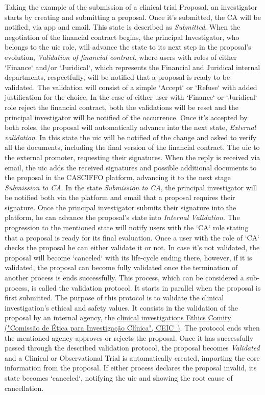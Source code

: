 Taking the example of the submission of a clinical trial Proposal, an investigator starts by creating and submitting a proposal. Once it's submitted, the CA will be notified, via app and email. This state is described as \textit{Submitted}.  
When the negotiation of the financial contract begins, the principal Investigator, who belongs to the \acrshort{uic} role, will advance the state to its next step in the proposal's evolution, \textit{Validation of financial contract}, where users with roles of either `Finance` and/or `Juridical`, which represents the Financial and Juridical internal departments, respectfully, will be notified that a proposal is ready to be validated. The validation will consist of a simple `Accept` or `Refuse` with added justification for the choice. In the case of either user with `Finance` or `Juridical` role reject the financial contract, both the validations will be reset and the principal investigator will be notified of the occurrence.  
Once it's accepted by both roles, the proposal will automatically advance into the next state, \textit{External validation}. In this state the \acrshort{uic} will be notified of the change and asked to verify all the documents, including the final version of the financial contract. The \acrshort{uic} to the external promoter, requesting their signatures. When the reply is received via email, the \acrshort{uic} adds the received signatures and possible additional documents to the proposal in the CASCIFFO platform, advancing it to the next stage \textit{Submission to CA}.  
In the state \textit{Submission to CA}, the principal investigator will be notified both via the platform and email that a proposal requires their signature. Once the principal investigator submits their signature into the platform, he can advance the proposal's state into \textit{Internal Validation}. The progression to the mentioned state will notify users with the `CA` role stating that a proposal is ready for its final evaluation.  
Once a user with the role of `CA` checks the proposal he can either validate it or not. In case it's not validated, the proposal will become `canceled` with its life-cycle ending there, however, if it is validated, the proposal can become fully validated once the termination of another process is ends successfully.  
This process, which can be considered a sub-process, is called the validation protocol. It starts in parallel when the proposal is first submitted.  
The purpose of this protocol is to validate the clinical investigation's ethical and safety values. It consists in the validation of the proposal by an internal agency, the \href{https://www.ceic.pt/}{clinical investigations Ethics Comity ("Comissão de Ética para Investigação Clínica", CEIC~\cite{ceic})}. The protocol ends when the mentioned agency approves or rejects the proposal.  
Once it has successfully passed through the described validation protocol, the proposal becomes \textit{Validated} and a Clinical or Observational Trial is automatically created, importing the core information from the proposal.  
If either process declares the proposal invalid, its state becomes `canceled`, notifying the \acrshort{uic} and showing the root cause of cancellation.

